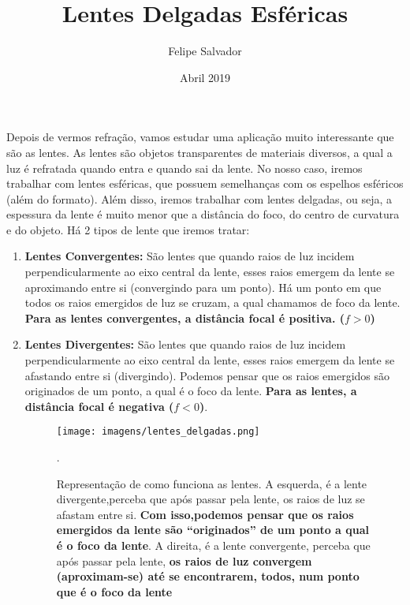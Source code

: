 \documentclass[12pt]{extarticle}
\title{Lentes Delgadas Esféricas}
\author{Felipe Salvador}
\date{Abril 2019}
\newcommand{\<}{\langle}
\renewcommand{\>}{\rangle}
\theoremstyle{definition}
\begin{document}
\maketitle
Depois de vermos refração, vamos estudar uma aplicação muito interessante que são as lentes. As lentes são objetos transparentes de materiais diversos, a qual a luz é refratada quando entra e quando sai da lente. No nosso caso, iremos trabalhar com lentes esféricas, que possuem semelhanças com os espelhos esféricos (além do formato). Além disso, iremos trabalhar com lentes delgadas, ou seja, a espessura da lente é muito menor que a distância do foco, do centro de curvatura e do objeto.
Há 2 tipos de lente que iremos tratar:
\begin{enumerate}
\item 
\textbf{Lentes Convergentes:}
São lentes que quando raios de luz incidem perpendicularmente ao eixo central da lente, esses raios emergem da lente se aproximando entre si (convergindo para um ponto). Há um ponto em que todos os raios emergidos de luz se cruzam, a qual chamamos de foco da lente. \textbf{Para as lentes convergentes, a distância focal é positiva. ($f > 0$)}

\item
\textbf{Lentes Divergentes:}
São lentes que quando raios de luz incidem perpendicularmente ao eixo central da lente, esses raios emergem da lente se afastando
entre si (divergindo). Podemos pensar que os raios emergidos são originados de um ponto, a qual é o foco da lente. \textbf{Para as lentes, a distância focal é negativa ($f < 0$)}.
\begin{figure}[H]
    \centering
    \texttt{[image: imagens/lentes\_delgadas.png]}
    \caption{Representação de como funciona as lentes. A esquerda, é a lente divergente,perceba que após passar pela lente, os raios de luz se afastam entre si. \textbf{Com isso,podemos pensar que os raios emergidos da lente são “originados” de um ponto a qual é o foco da lente}. A direita, é a lente convergente, perceba que após passar pela lente, \textbf{os raios de luz convergem (aproximam-se) até se encontrarem, todos, num ponto que é o foco da lente}} .
    \label{fig:convergente}
\end{figure}
\end{enumerate}
\end{document}
